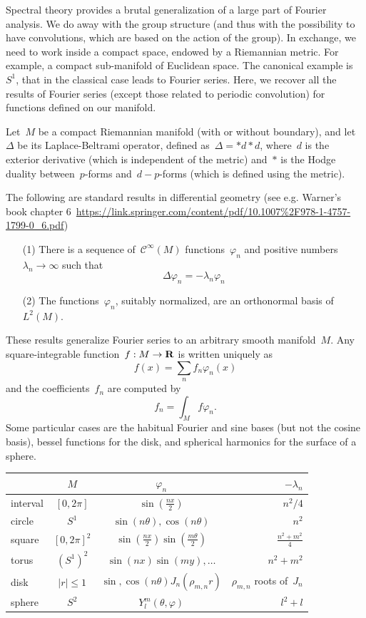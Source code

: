 Spectral theory provides a brutal generalization of a large part of
Fourier analysis.  We do away with the group structure (and thus with
the possibility to have convolutions, which are based on the action
of the group).  In exchange, we need to work inside a compact space,
endowed by a Riemannian metric.  For example, a compact sub-manifold
of Euclidean space.  The canonical example is~$S^1$, that in
the classical case leads to Fourier series.  Here, we recover all
the results of Fourier series (except those related to periodic
convolution) for functions defined on our manifold.

Let~$M$ be a compact Riemannian manifold (with or without boundary), and
let~$\Delta$ be its Laplace-Beltrami operator, defined
as~$\Delta=*d*d$, where~$d$ is the exterior derivative (which is independent
of the metric) and~$*$ is the Hodge duality between~$p$-forms
and~$d-p$-forms (which is defined using the metric).

The following are standard results in differential geometry (see e.g.
Warner's book chapter
6~\url{https://link.springer.com/content/pdf/10.1007\%2F978-1-4757-1799-0_6.pdf})

\begin{itemize}
	\item[(1)] There is a sequence of~$\mathcal{C}^\infty(M)$
		functions~$\varphi_n$ and positive
		numbers~$\lambda_n\to\infty$ such that
		$$\Delta\varphi_n=-\lambda_n\varphi_n$$
	\item[(2)] The functions~$\varphi_n$, suitably normalized, are an
		orthonormal basis of~$L^2(M)$.
\end{itemize}

These results generalize Fourier series to an arbitrary smooth manifold~$M$.
Any square-integrable function~$f:M\to\mathbf{R}$ is written uniquely as
$$f(x)=\sum_nf_n\varphi_n(x)$$ and the coefficients~$f_n$ are computed by
$$f_n=\int_Mf\varphi_n.$$  Some particular cases are the habitual Fourier and
sine bases (but not the cosine basis), bessel functions for the disk, and
spherical harmonics for the surface of a sphere.

\begin{tabular}{lccr}
	&$M$ & $\varphi_n$ & $-\lambda_n$ \\
	\hline
	interval & $[0,2\pi]$ & $\sin\left(\frac{nx}{2}\right)$ & $n^2/4$ \\
	circle & $S^1$ & $\sin(n\theta),\cos(n\theta)$ & $n^2$ \\
	square & $[0,2\pi]^2$ &
	$\sin\left(\frac{nx}{2}\right)\sin\left(\frac{m\theta}{2}\right)$ &
	$\frac{n^2+m^2}{4}$ \\
	torus & $(S^1)^2$ & $\sin(nx)\sin(my),\ldots$ & $n^2+m^2$ \\
	disk & $|r|\le1$ & $\sin,\cos(n\theta)J_n(\rho_{m,n}r)$ &
	$\rho_{m,n}$ roots of~$J_n$ \\
	sphere & $S^2$ & $Y^m_l(\theta,\varphi)$ & $l^2+l$
\end{tabular}

